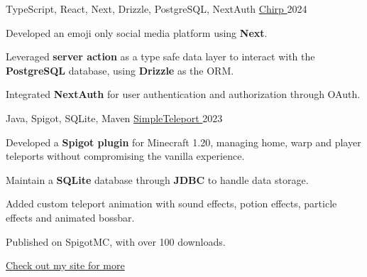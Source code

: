 

\begin{cventries}
\cventry
{TypeScript, React, Next, Drizzle, PostgreSQL, NextAuth} %
{\href{https://chirp-one-amber.vercel.app/}{Chirp {\faLink}}} %
{} %
{2024} %
{
  \begin{cvitems} %
    \item {Developed an emoji only social media platform using \textbf{Next}.}
    \item {Leveraged \textbf{server action} as a type safe data layer to interact with the \textbf{PostgreSQL} database, using \textbf{Drizzle} as the ORM.}
    \item {Integrated \textbf{NextAuth} for user authentication and authorization through OAuth.}
  \end{cvitems}
}

  \cventry
    {Java, Spigot, SQLite, Maven} %
    {\href{https://github.com/shiqui/simple-teleport}{SimpleTeleport {\faLink}}} %
    {} %
    {2023} %
    {
      \begin{cvitems} %
        \item {Developed a \textbf{Spigot plugin} for Minecraft 1.20, managing home, warp and player teleports without compromising the vanilla experience.}
        \item {Maintain a \textbf{SQLite} database through \textbf{JDBC} to handle data storage.}
        \item {Added custom teleport animation with sound effects, potion effects, particle effects and animated bossbar.}
        \item {Published on SpigotMC, with over 100 downloads.}
      \end{cvitems}
    }
    
\href{https://shiqui.me/projects}{Check out my site for more {\faLink}}


\end{cventries}
